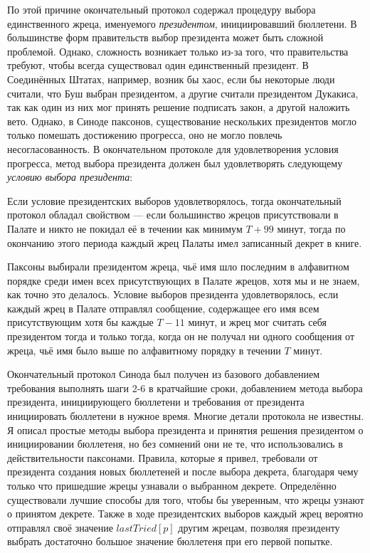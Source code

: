 \documentclass[12pt, a4paper]{article} %
\begin{document}
По этой причине окончательный протокол содержал процедуру выбора единственного жреца, именуемого  \textit{президентом}, инициировавший бюллетени. В большинстве форм правительств выбор президента может быть сложной проблемой. Однако, сложность возникает только из-за того, что правительства требуют, чтобы всегда существовал один единственный президент. В Соединённых Штатах, например, возник бы хаос, если бы некоторые люди считали, что Буш выбран президентом, а другие считали президентом Дукакиса, так как один из них мог принять решение подписать закон, а другой наложить вето. Однако, в Синоде паксонов, существование нескольких президентов могло только помешать достижению прогресса, оно не могло повлечь несогласованность. В окончательном протоколе для удовлетворения условия прогресса, метод выбора президента должен был удовлетворять следующему \textit{условию выбора президента}:


Если условие президентских выборов удовлетворялось, тогда окончательный протокол обладал свойством --- если большинство жрецов присутствовали в Палате и никто не покидал её в течении как минимум $T + 99$ минут, тогда по окончанию этого периода каждый жрец Палаты имел записанный декрет в книге.

Паксоны выбирали президентом жреца, чьё имя шло последним в алфавитном порядке среди имен всех  присутствующих в Палате жрецов, хотя мы и не знаем, как точно это делалось. Условие выборов президента удовлетворялось, если каждый жрец в Палате отправлял сообщение, содержащее его имя всем присутствующим хотя бы каждые $T - 11$ минут, и жрец мог считать себя президентом тогда и только тогда, когда он не получал ни одного сообщения от жреца, чьё имя было выше по алфавитному порядку в течении $T$ минут.

Окончательный протокол Синода был получен из базового добавлением требования выполнять шаги 2-6 в кратчайшие сроки, добавлением метода выбора президента, инициирующего бюллетени и требования от президента инициировать бюллетени в нужное время. Многие детали протокола не известны. Я описал простые методы выбора президента и принятия решения президентом о инициировании бюллетеня, но без сомнений они не те, что использовались в действительности паксонами. Правила, которые я привел, требовали от президента создания новых бюллетеней и после выбора декрета, благодаря чему только что пришедшие жрецы узнавали о выбранном декрете. Определённо существовали лучшие способы для того, чтобы бы уверенным, что жрецы узнают о принятом декрете. Также в ходе президентских выборов каждый жрец вероятно отправлял своё значение $lastTried[p]$  другим жрецам, позволяя президенту выбрать достаточно большое значение бюллетеня при его первой попытке.
\end{document}
